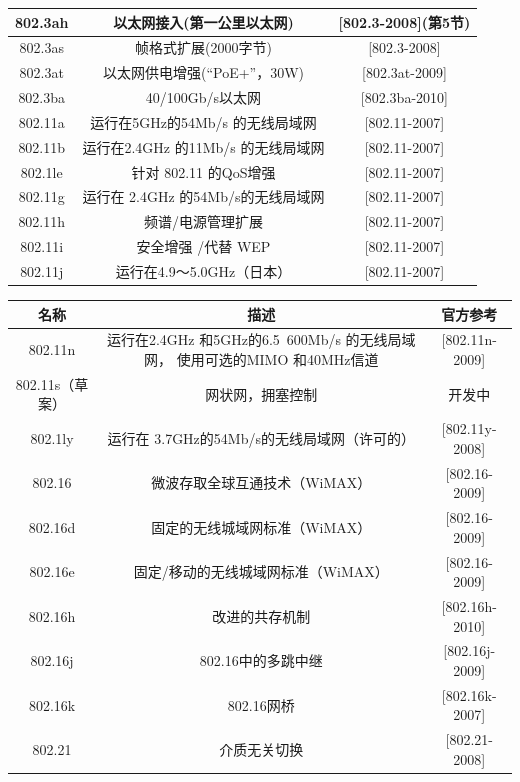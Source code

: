 \begin{table}[]
\begin{tabular}{c|c|c}
        802.3ah	&	以太网接入(第一公里以太网)	&	[802.3-2008](第5节)  \\ \hline
        802.3as	&	帧格式扩展(2000字节)	&	[802.3-2008]  \\ \hline
        802.3at	&	以太网供电增强(“PoE+”，30W)	&	[802.3at-2009]  \\ \hline
        802.3ba	&	40/100Gb/s以太网	&	[802.3ba-2010]  \\ \hline
        802.11a	&	运行在5GHz的54Mb/s 的无线局域网	&	[802.11-2007]  \\ \hline
        802.11b	&	运行在2.4GHz 的11Mb/s 的无线局域网	&	[802.11-2007]  \\ \hline
        802.1le	&	针对 802.11 的QoS增强	&	[802.11-2007]  \\ \hline
        802.11g	&	运行在 2.4GHz 的54Mb/s的无线局域网	&	[802.11-2007]  \\ \hline
        802.11h	&	频谱/电源管理扩展	&	[802.11-2007]  \\ \hline
        802.11i	&	安全增强 /代替 WEP	&	[802.11-2007]  \\ \hline
        802.11j	&	运行在4.9～5.0GHz（日本）	&	[802.11-2007]  \\ \hline
    \end{tabular}
\end{table}

\begin{table}[]
    \centering
    \begin{tabular}{c|c|c}
        \hline
        名称	&	描述	&	官方参考  \\ \hline
        802.11n	&	运行在2.4GHz 和5GHz的6.5~600Mb/s 的无线局域网， 使用可选的MIMO 和40MHz信道	&	[802.11n-2009]  \\ \hline
        802.11s（草案）	&	网状网，拥塞控制	&	开发中  \\ \hline
        802.1ly	&	运行在 3.7GHz的54Mb/s的无线局域网（许可的）	&	[802.11y-2008]  \\ \hline
        802.16	&	微波存取全球互通技术（WiMAX）	&	[802.16-2009]  \\ \hline
        802.16d	&	固定的无线城域网标准（WiMAX）	&	[802.16-2009]  \\ \hline
        802.16e	&	固定/移动的无线城域网标准（WiMAX）	&	[802.16-2009]  \\ \hline
        802.16h	&	改进的共存机制	&	[802.16h-2010]  \\ \hline
        802.16j	&	802.16中的多跳中继	&	[802.16j-2009]  \\ \hline
        802.16k	&	802.16网桥	&	[802.16k-2007]  \\ \hline
        802.21	&	介质无关切换	&	[802.21-2008]  \\ \hline
    \end{tabular}
\end{table}

